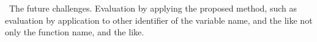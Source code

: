 \documentclass[JIP]{apris}
\begin{document}
 The future challenges. Evaluation by applying the proposed method, such as evaluation by application to other identifier of the variable name, and the like not only the function name, and the like.





\end{document}
